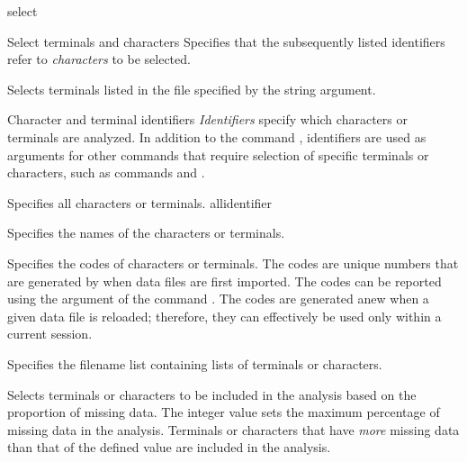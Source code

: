\begin{command}{select}{}
\begin{arguments}
\begin{argumentgroup}{Select terminals and characters}
                {Specifies that the subsequently listed identifiers
                refer to \emph{characters} to be selected.}
                {}

                {Selects terminals listed in the file specified by the string argument.}
                {}

		\end{argumentgroup}
		
        \begin{argumentgroup}{Character and terminal identifiers}\label{identifiers}
        {\emph{Identifiers} specify which characters or terminals are analyzed.
        In addition to the command , identifiers are used as
        arguments for other commands that require selection of specific terminals or
        characters, such as commands  and
        .}

                {Specifies all characters or terminals.}
                {allidentifier}

                {Specifies the names of the characters or terminals.}
                {}

                {Specifies the codes of characters or terminals. The codes are unique
                numbers that are generated by \poy when data files are first imported.
                The codes can be reported using the argument 
                of the command . The codes are generated anew
                when a given data file is reloaded; therefore, they can effectively be used
                only within a current \poy session.}
                {}

                {Specifies the filename list containing lists of terminals or
                characters.}
                {}

                {Selects terminals or characters to be included in the analysis
                based on the proportion of missing data. The
                integer value sets the maximum percentage of missing
                data in the analysis. Terminals or characters that have \emph{more} missing data
                than that of the defined value are included in the analysis.}
                {}
               

\end{argumentgroup}
\end{arguments}
\end{command}
